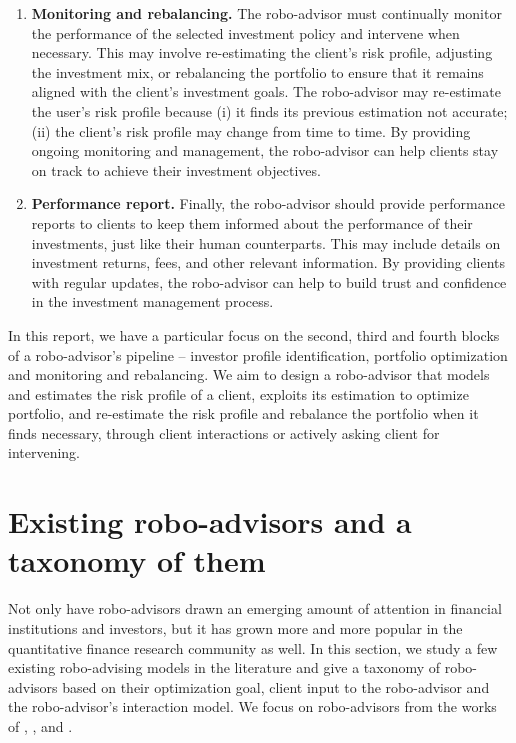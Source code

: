 \begin{enumerate}
    \item \textbf{Monitoring and rebalancing.} The robo-advisor must continually monitor the performance of the selected investment policy and intervene when necessary. This may involve re-estimating the client's risk profile, adjusting the investment mix, or rebalancing the portfolio to ensure that it remains aligned with the client's investment goals. The robo-advisor may re-estimate the user’s risk profile because (i) it finds its previous estimation not accurate; (ii) the client’s risk profile may change from time to time. By providing ongoing monitoring and management, the robo-advisor can help clients stay on track to achieve their investment objectives. 

    \item \textbf{Performance report.} Finally, the robo-advisor should provide performance reports to clients to keep them informed about the performance of their investments, just like their human counterparts. This may include details on investment returns, fees, and other relevant information. By providing clients with regular updates, the robo-advisor can help to build trust and confidence in the investment management process.
\end{enumerate}

In this report, we have a particular focus on the second, third and fourth blocks of a robo-advisor's pipeline -- investor profile identification, portfolio optimization and monitoring and rebalancing. We aim to design a robo-advisor that models and estimates the risk profile of a client, exploits its estimation to optimize portfolio, and re-estimate the risk profile and rebalance the portfolio when it finds necessary, through client interactions or actively asking client for intervening.

\section{Existing robo-advisors and a taxonomy of them}
Not only have robo-advisors drawn an emerging amount of attention in financial institutions and investors, but it has grown more and more popular in the quantitative finance research community as well. In this section, we study a few existing robo-advising models in the literature and give a taxonomy of robo-advisors based on their optimization goal, client input to the robo-advisor and the robo-advisor's interaction model. We focus on robo-advisors from the works of , ,  and .

